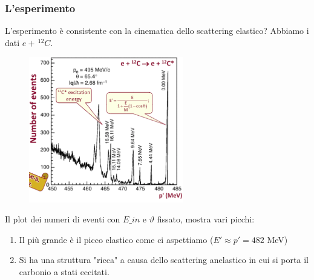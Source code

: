 \subsubsection{L'esperimento}
L'esperimento è consistente con la cinematica dello scattering elastico? Abbiamo i dati $e+\,^{12}C$.
\begin{figure}[H]
    \centering
    \includegraphics[width=0.6\textwidth]{immagini/fig_plot_eN_scatt.png}
\end{figure}
Il plot dei numeri di eventi con $E\_{in}$ e $\vartheta$ fissato, mostra vari picchi:
\begin{enumerate}
    \item Il più grande è il picco elastico come ci aspettiamo ($E'\approx p'=482$ MeV)
    \item Si ha una struttura "ricca" a causa dello scattering anelastico in cui si porta il carbonio a stati eccitati.
\end{enumerate}
 